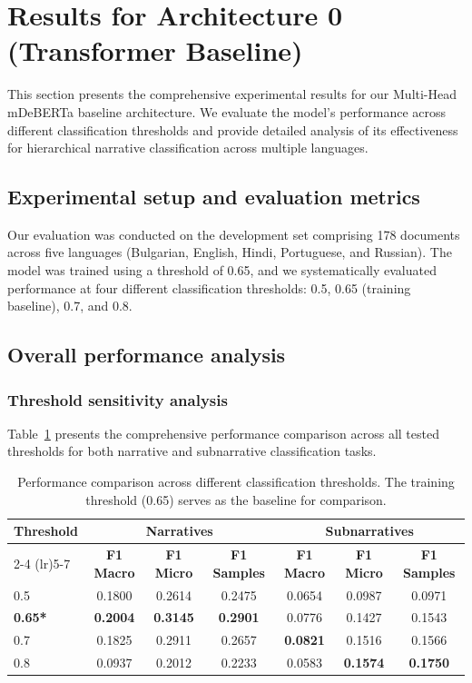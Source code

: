 \section{Results for Architecture 0 (Transformer Baseline)}
\label{sec:transformer-baseline-results}

This section presents the comprehensive experimental results for our Multi-Head mDeBERTa baseline architecture. We evaluate the model's performance across different classification thresholds and provide detailed analysis of its effectiveness for hierarchical narrative classification across multiple languages.

\subsection{Experimental setup and evaluation metrics}

Our evaluation was conducted on the development set comprising 178 documents across five languages (Bulgarian, English, Hindi, Portuguese, and Russian). The model was trained using a threshold of 0.65, and we systematically evaluated performance at four different classification thresholds: 0.5, 0.65 (training baseline), 0.7, and 0.8.

\subsection{Overall performance analysis}

\subsubsection{Threshold sensitivity analysis}

Table~\ref{tab:threshold-comparison} presents the comprehensive performance comparison across all tested thresholds for both narrative and subnarrative classification tasks.

\begin{table}[htbp]
\centering
\caption{Performance comparison across different classification thresholds. The training threshold (0.65) serves as the baseline for comparison.}
\label{tab:threshold-comparison}
\begin{tabular}{lcccccc}
\toprule
\multirow{2}{*}{\textbf{Threshold}} & \multicolumn{3}{c}{\textbf{Narratives}} & \multicolumn{3}{c}{\textbf{Subnarratives}} \\
\cmidrule(lr){2-4} \cmidrule(lr){5-7}
& \textbf{F1 Macro} & \textbf{F1 Micro} & \textbf{F1 Samples} & \textbf{F1 Macro} & \textbf{F1 Micro} & \textbf{F1 Samples} \\
\midrule
0.5 & 0.1800 & 0.2614 & 0.2475 & 0.0654 & 0.0987 & 0.0971 \\
\textbf{0.65*} & \textbf{0.2004} & \textbf{0.3145} & \textbf{0.2901} & 0.0776 & 0.1427 & 0.1543 \\
0.7 & 0.1825 & 0.2911 & 0.2657 & \textbf{0.0821} & 0.1516 & 0.1566 \\
0.8 & 0.0937 & 0.2012 & 0.2233 & 0.0583 & \textbf{0.1574} & \textbf{0.1750} \\
\bottomrule
\end{tabular}
\end{table}

